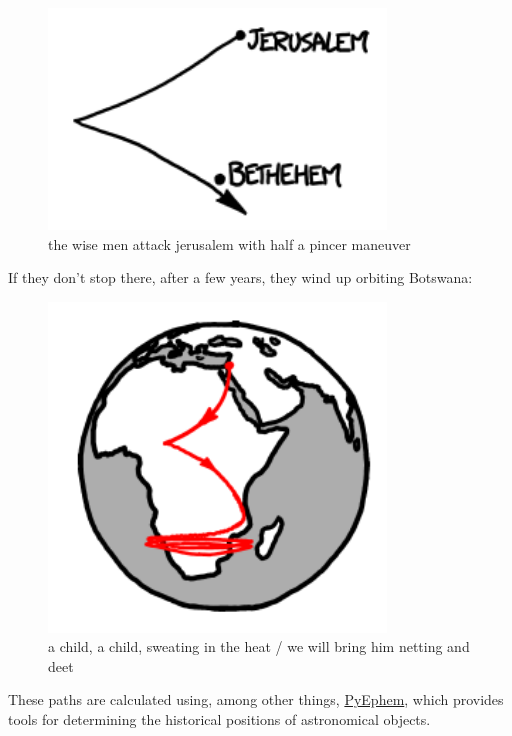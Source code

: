 \begin{figure}[!htbp]
\centering
\includegraphics[scale=0.5, max width=0.8\textwidth]{imgs/a/25/magi_sirius_realistic_close.png}
\caption{the wise men attack jerusalem with half a pincer maneuver}
\end{figure}

{If they don’t stop there, after a few years, they wind up orbiting Botswana:}

\begin{figure}[!htbp]
\centering
\includegraphics[scale=0.5, max width=0.8\textwidth]{imgs/a/25/magi_sirius_realistic.png}
\caption{a child, a child, sweating in the heat / we will bring him netting and deet}
\end{figure}

{These paths are calculated using, among other things, \href{http://rhodesmill.org/pyephem/}{PyEphem}, which provides tools for determining the historical positions of astronomical objects.}

